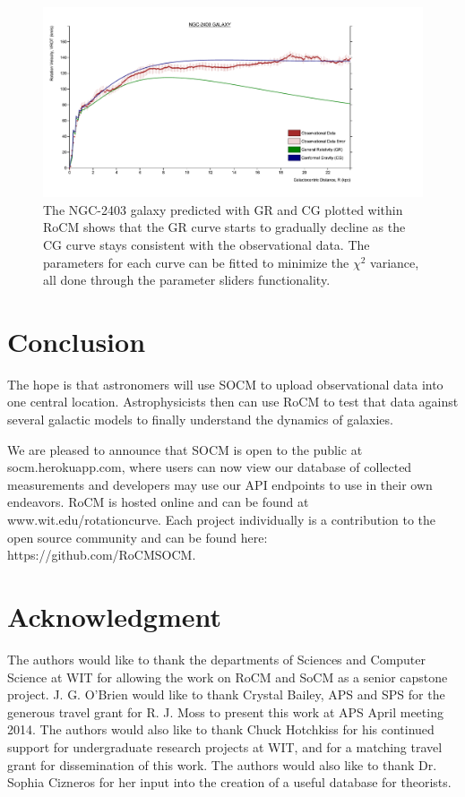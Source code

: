\documentclass[conference]{IEEEtran-modified}
\begin{document}
\begin{figure}[h!]
\centering
\includegraphics[width=\textwidth]{NGC-2403}
\caption{The NGC-2403 galaxy predicted with GR and CG plotted within RoCM shows that the GR curve starts to gradually decline as the CG curve stays consistent with the observational data. The parameters for each curve can be fitted to minimize the $\chi^2$ variance, all done through the parameter sliders functionality.}
\label{ngc2403plot}
\end{figure}


\newpage

\section{Conclusion}
The hope is that astronomers will use SOCM to upload observational data into one central location. Astrophysicists then can use RoCM to test that data against several galactic models to finally understand the dynamics of galaxies. 

	 We are pleased to announce that SOCM is open to the public at socm.herokuapp.com, where users can now view our database of collected measurements and developers may use our API endpoints to use in their own endeavors. RoCM is hosted online and can be found at www.wit.edu/rotationcurve. Each project individually is a contribution to the open source community and can be found here: https://github.com/RoCMSOCM.



\section*{Acknowledgment}

The authors would like to thank the departments of Sciences and Computer Science at WIT for allowing the work on RoCM and SoCM as a senior capstone project. J. G. O'Brien would like to thank Crystal Bailey, APS and SPS for the generous travel grant for R. J. Moss to present this work at APS April meeting 2014. The authors would also like to thank Chuck Hotchkiss for his continued support for undergraduate research projects at WIT, and for a matching travel grant for dissemination of this work. The authors would also like to thank Dr. Sophia Cizneros for her input into the creation of a useful database for theorists.
\end{document}
